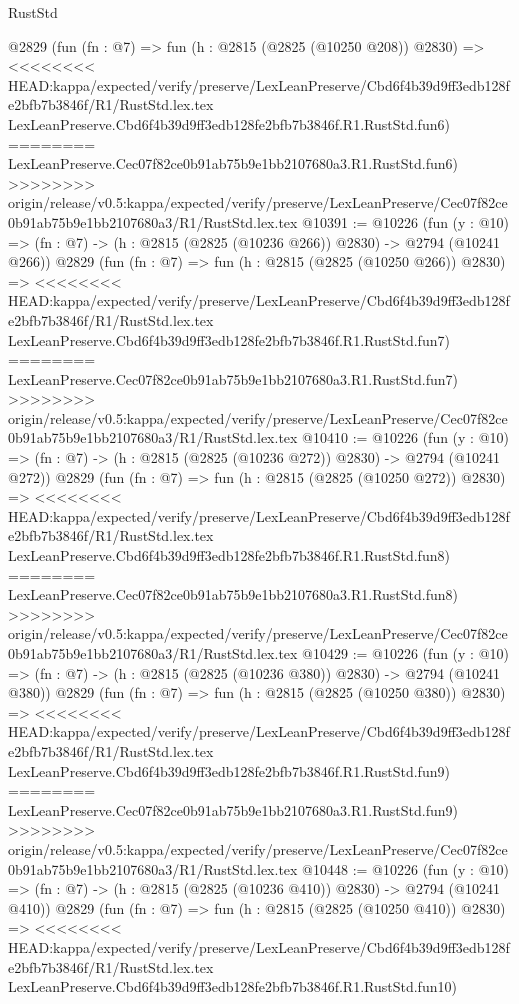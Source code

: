 \begin{lexlean}{RustStd}
\begin{coremodule}
{\begin{coremodule}
{{{{{{{{{{{{{{{    @2829
    (fun (fn : @7) =>
    fun (h : @2815 (@2825 (@10250 @208)) @2830) =>
<<<<<<<< HEAD:kappa/expected/verify/preserve/LexLeanPreserve/Cbd6f4b39d9ff3edb128fe2bfb7b3846f/R1/RustStd.lex.tex
    LexLeanPreserve.Cbd6f4b39d9ff3edb128fe2bfb7b3846f.R1.RustStd.fun6)
========
    LexLeanPreserve.Cec07f82ce0b91ab75b9e1bb2107680a3.R1.RustStd.fun6)
>>>>>>>> origin/release/v0.5:kappa/expected/verify/preserve/LexLeanPreserve/Cec07f82ce0b91ab75b9e1bb2107680a3/R1/RustStd.lex.tex
@10391 := @10226
    (fun (y : @10) => (fn : @7) -> (h : @2815 (@2825 (@10236 @266)) @2830) -> @2794 (@10241 @266))
    @2829
    (fun (fn : @7) =>
    fun (h : @2815 (@2825 (@10250 @266)) @2830) =>
<<<<<<<< HEAD:kappa/expected/verify/preserve/LexLeanPreserve/Cbd6f4b39d9ff3edb128fe2bfb7b3846f/R1/RustStd.lex.tex
    LexLeanPreserve.Cbd6f4b39d9ff3edb128fe2bfb7b3846f.R1.RustStd.fun7)
========
    LexLeanPreserve.Cec07f82ce0b91ab75b9e1bb2107680a3.R1.RustStd.fun7)
>>>>>>>> origin/release/v0.5:kappa/expected/verify/preserve/LexLeanPreserve/Cec07f82ce0b91ab75b9e1bb2107680a3/R1/RustStd.lex.tex
@10410 := @10226
    (fun (y : @10) => (fn : @7) -> (h : @2815 (@2825 (@10236 @272)) @2830) -> @2794 (@10241 @272))
    @2829
    (fun (fn : @7) =>
    fun (h : @2815 (@2825 (@10250 @272)) @2830) =>
<<<<<<<< HEAD:kappa/expected/verify/preserve/LexLeanPreserve/Cbd6f4b39d9ff3edb128fe2bfb7b3846f/R1/RustStd.lex.tex
    LexLeanPreserve.Cbd6f4b39d9ff3edb128fe2bfb7b3846f.R1.RustStd.fun8)
========
    LexLeanPreserve.Cec07f82ce0b91ab75b9e1bb2107680a3.R1.RustStd.fun8)
>>>>>>>> origin/release/v0.5:kappa/expected/verify/preserve/LexLeanPreserve/Cec07f82ce0b91ab75b9e1bb2107680a3/R1/RustStd.lex.tex
@10429 := @10226
    (fun (y : @10) => (fn : @7) -> (h : @2815 (@2825 (@10236 @380)) @2830) -> @2794 (@10241 @380))
    @2829
    (fun (fn : @7) =>
    fun (h : @2815 (@2825 (@10250 @380)) @2830) =>
<<<<<<<< HEAD:kappa/expected/verify/preserve/LexLeanPreserve/Cbd6f4b39d9ff3edb128fe2bfb7b3846f/R1/RustStd.lex.tex
    LexLeanPreserve.Cbd6f4b39d9ff3edb128fe2bfb7b3846f.R1.RustStd.fun9)
========
    LexLeanPreserve.Cec07f82ce0b91ab75b9e1bb2107680a3.R1.RustStd.fun9)
>>>>>>>> origin/release/v0.5:kappa/expected/verify/preserve/LexLeanPreserve/Cec07f82ce0b91ab75b9e1bb2107680a3/R1/RustStd.lex.tex
@10448 := @10226
    (fun (y : @10) => (fn : @7) -> (h : @2815 (@2825 (@10236 @410)) @2830) -> @2794 (@10241 @410))
    @2829
    (fun (fn : @7) =>
    fun (h : @2815 (@2825 (@10250 @410)) @2830) =>
<<<<<<<< HEAD:kappa/expected/verify/preserve/LexLeanPreserve/Cbd6f4b39d9ff3edb128fe2bfb7b3846f/R1/RustStd.lex.tex
    LexLeanPreserve.Cbd6f4b39d9ff3edb128fe2bfb7b3846f.R1.RustStd.fun10)
}}}}}}}}}}}}}}}
\end{coremodule}}
\end{coremodule}
\end{lexlean}
